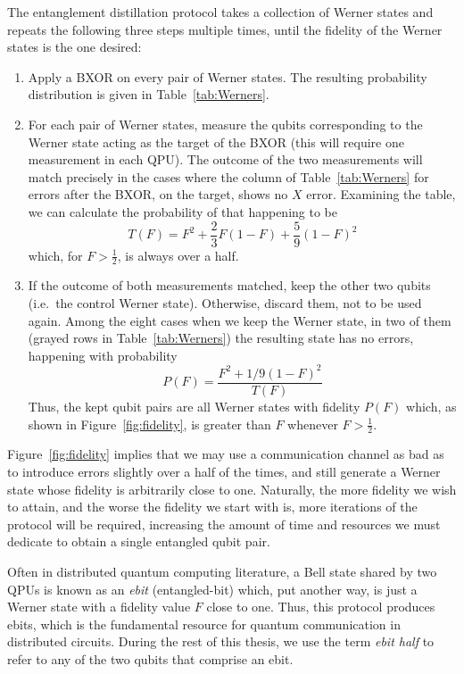 The entanglement distillation protocol takes a collection of Werner states and repeats the following three steps multiple times, until the fidelity of the Werner states is the one desired:

\begin{enumerate}
  \item Apply a BXOR on every pair of Werner states. The resulting probability distribution is given in Table~\ref{tab:Werners}.

  \item For each pair of Werner states, measure the qubits corresponding to the Werner state acting as the target of the BXOR (this will require one measurement in each QPU). The outcome of the two measurements will match precisely in the cases where the column of Table~\ref{tab:Werners} for errors after the BXOR, on the target, shows no \(X\) error. Examining the table, we can calculate the probability of that happening to be {\small \[T(F) = F^2 + \frac{2}{3} F(1-F) + \frac{5}{9} (1-F)^2\]} which, for \(F > \frac{1}{2}\), is always over a half.

  \item If the outcome of both measurements matched, keep the other two qubits (i.e.\ the control Werner state). Otherwise, discard them, not to be used again. Among the eight cases when we keep the Werner state, in two of them (grayed rows in Table~\ref{tab:Werners}) the resulting state has no errors, happening with probability {\small \[P(F) = \frac{F^2 + 1/9(1-F)^2}{T(F)}\]} Thus, the kept qubit pairs are all Werner states with fidelity \(P(F)\) which, as shown in Figure~\ref{fig:fidelity}, is greater than \(F\) whenever \(F > \frac{1}{2}\).
\end{enumerate}





Figure~\ref{fig:fidelity} implies that we may use a communication channel as bad as to introduce errors slightly over a half of the times, and still generate a Werner state whose fidelity is arbitrarily close to one. Naturally, the more fidelity we wish to attain, and the worse the fidelity we start with is, more iterations of the protocol will be required, increasing the amount of time and resources we must dedicate to obtain a single entangled qubit pair.

Often in distributed quantum computing literature, a Bell state shared by two QPUs is known as an \textit{ebit} (entangled-bit) which, put another way, is just a Werner state with a fidelity value \(F\) close to one. Thus, this protocol produces ebits, which is the fundamental resource for quantum communication in distributed circuits. During the rest of this thesis, we use the term \textit{ebit half} to refer to any of the two qubits that comprise an ebit.


